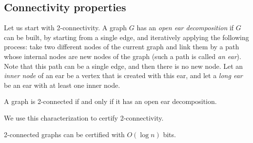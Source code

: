 \documentclass[a4paper,thm-restate,USenglish]{lipics-v2019}
\begin{document}
\subsection{Connectivity properties}

Let us start with 2-connectivity. A graph $G$ has an \emph{open ear decomposition} if $G$ can be built, by starting from a single edge, and iteratively applying the following process: take two different nodes of the current graph and link them by a path whose internal nodes are new nodes of the graph (such a path is called \emph{an ear}). Note that this path can be a single edge, and then there is no new node.
Let an \emph{inner node} of an ear be a vertex that is created with this ear, and let a \emph{long ear} be an ear with at least one inner node.

\begin{theorem}
A graph is 2-connected if and only if it has an open ear decomposition.
\end{theorem}

We use this characterization to certify 2-connectivity.
\begin{lemma}\label{lem:2-connected-graphs}
2-connected graphs can be certified with $O(\log n)$ bits.
\end{lemma}
\end{document}
